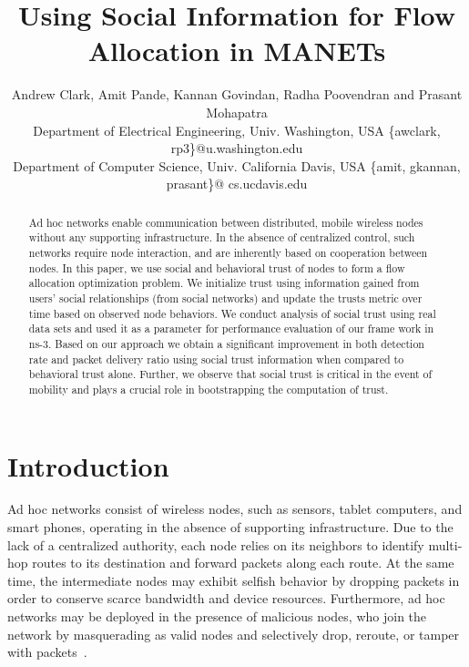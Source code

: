 \documentclass[conference]{IEEEtran}
\begin{document}
\title{ Using Social Information for Flow Allocation in MANETs}
\author{
Andrew Clark, Amit Pande, Kannan Govindan,
Radha Poovendran and Prasant Mohapatra\\
 Department of Electrical Engineering, Univ. Washington, USA \{awclark, rp3\}@u.washington.edu\\
 Department of Computer Science, Univ. California Davis, USA \{amit, gkannan, prasant\}@ cs.ucdavis.edu\\

}


\maketitle
\begin{abstract}
Ad hoc networks enable communication between distributed, mobile wireless nodes without any supporting infrastructure. In the absence of centralized control, such networks require node interaction, and are inherently based on cooperation between nodes. In this paper, we use social and behavioral trust of nodes to form a flow allocation optimization problem.
We initialize trust using information gained from users' social relationships (from social networks) and update the trusts metric over time based on observed node behaviors. We conduct analysis of social trust  using real data sets and used it as a parameter for performance evaluation of our frame work in ns-3. Based on our approach we obtain a significant improvement in both detection rate and packet delivery ratio using social trust information when compared to behavioral trust alone. Further, we observe that social trust is critical in the event of mobility and plays a crucial role in bootstrapping the computation of trust.
\end{abstract}

\section{Introduction}
\label{sec:intro}
Ad hoc networks  consist of wireless nodes, such as sensors, tablet computers, and smart phones, operating in the absence of supporting infrastructure.
 Due to the lack of a centralized authority, each node relies on its neighbors to identify multi-hop routes to its destination and forward packets along each route.
 At the same time, the intermediate nodes may exhibit selfish behavior by dropping packets in order to conserve scarce bandwidth and device resources.
	Furthermore, ad hoc networks may be deployed in the presence of malicious nodes, who join the network by masquerading as valid nodes and selectively drop, reroute, or tamper with packets~\cite{karlof2003secure}.
\end{document}
